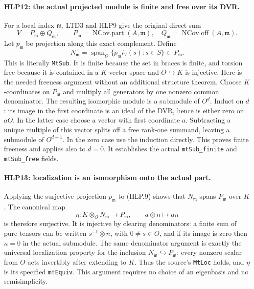\paragraph{HLP12: the actual projected module is finite and free over its DVR.}
\label{claim:HLP12}
For a local index \(\mathfrak m\), LTD3 and HLP9 give the original
direct sum
\[
 V=P_{\mathfrak m}\oplus Q_{\mathfrak m},\qquad
 P_{\mathfrak m}=\operatorname{NCov.part}(A,\mathfrak m),\quad
 Q_{\mathfrak m}=\operatorname{NCov.off}(A,\mathfrak m).
\]
Let \(p_{\mathfrak m}\) be projection along this exact complement.
Define
\[
 N_{\mathfrak m}
   =\operatorname{span}_O\{p_{\mathfrak m}i_V(s):s\in S\}
       \subset P_{\mathfrak m}.                      \tag{HLP.10}
\]
This is literally \texttt{Mt\allowbreak Sub}. It is finite because the set in
braces is finite, and torsion free because it is contained in a
\(K\)-vector space and \(O\hookrightarrow K\) is injective.
Here is the needed freeness argument without an additional
structure theorem. Choose \(K\)-coordinates on \(P_{\mathfrak m}\)
and multiply all generators by one nonzero common denominator.
The resulting isomorphic module is a submodule of \(O^d\).
Induct on \(d\): its image in the first coordinate is an ideal of
the DVR, hence is either zero or \(aO\). In the latter case choose
a vector with first coordinate \(a\). Subtracting a unique multiple
of this vector splits off a free rank-one summand, leaving a
submodule of \(O^{d-1}\). In the zero case use the induction
directly. This proves finite freeness and applies also to \(d=0\).
It establishes the actual \texttt{mt\allowbreak Sub\_\allowbreak finite} and
\texttt{mt\allowbreak Sub\_\allowbreak free} fields.

\paragraph{HLP13: localization is an isomorphism onto the actual part.}
\label{claim:HLP13}
Applying the surjective projection \(p_{\mathfrak m}\) to (HLP.9)
shows that \(N_{\mathfrak m}\) spans \(P_{\mathfrak m}\) over \(K\).
The canonical map
\[
 \eta:K\otimes_ON_{\mathfrak m}\longrightarrow P_{\mathfrak m},
                  \qquad a\otimes n\longmapsto an    \tag{HLP.11}
\]
is therefore surjective. It is injective by clearing denominators:
a finite sum of pure tensors can be written \(s^{-1}\otimes n\),
with \(0\ne s\in O\), and if its image is zero then \(n=0\)
in the actual submodule. The same denominator argument is exactly
the universal localization property for the inclusion
\(N_{\mathfrak m}\hookrightarrow P_{\mathfrak m}\): every
nonzero scalar from \(O\) acts invertibly after extending to \(K\).
Thus the source's \texttt{Mt\allowbreak Loc} holds, and \(\eta\) is its
specified \texttt{mt\allowbreak Equiv}. This argument requires no choice of
an eigenbasis and no semisimplicity.

